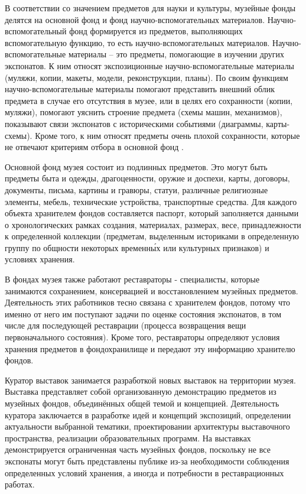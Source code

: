 В соответствии со значением предметов для науки и культуры, музейные фонды делятся на основной фонд и фонд научно-вспомогательных материалов. Научно-вспомогательный фонд формируется из предметов, выполняющих вспомогательную функцию, то есть научно-вспомогательных материалов. Научно-вспомогательные материалы – это предметы, помогающие в изучении других экспонатов. К ним относят экспозиционные научно-вспомогательные материалы (муляжи, копии, макеты, модели, реконструкции, планы). По своим функциям научно-вспомогательные материалы помогают представить внешний облик предмета в случае его отсутствия в музее, или в целях его сохранности (копии, муляжи), помогают уяснить строение предмета (схемы машин, механизмов), показывают связи экспонатов с историческими событиями (диаграммы, карты-схемы). Кроме того, к ним относят предметы очень плохой сохранности, которые не отвечают критериям отбора в основной фонд \cite{site:sources2}. \par

Основной фонд музея состоит из подлинных предметов. Это могут быть предметы быта и одежды, драгоценности, оружие и доспехи, карты, договоры, документы, письма, картины и гравюры, статуи, различные религиозные элементы, мебель, технические устройства, транспортные средства. Для каждого объекта хранителем фондов составляется паспорт, который заполняется данными о хронологических рамках создания, материалах, размерах, весе, принадлежности к определенной коллекции (предметам, выделенным историками в определенную группу по общности некоторых временн\'{ы}х или культурных признаков) и условиях хранения. \par

В фондах музея также работают реставраторы - специалисты, которые занимаются сохранением, консервацией и восстановлением музейных предметов. Деятельность этих работников тесно связана с хранителем фондов, потому что именно от него им поступают задачи по оценке состояния экспонатов, в том числе для последующей реставрации (процесса возвращения вещи первоначального состояния). Кроме того, реставраторы определяют условия хранения предметов в фондохранилище и передают эту информацию хранителю фондов. \par

Куратор выставок занимается разработкой новых выставок на территории музея. Выставка представляет собой организованную демонстрацию предметов из музейных фондов, объединённых общей темой и концепцией. Деятельность куратора заключается в разработке идей и концепций экспозиций, определении актуальности выбранной тематики, проектировании архитектуры выставочного пространства, реализации образовательных программ. На выставках демонстрируется ограниченная часть музейных фондов, поскольку не все экспонаты могут быть представлены публике из-за необходимости соблюдения определенных условий хранения, а иногда и потребности в реставрационных работах. \par

